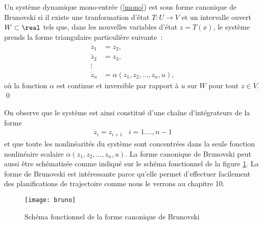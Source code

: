\begin{definition}{\blanc}

Un système dynamique mono-entrée (\ref{mono}) est sous forme canonique de Brunovski si il existe
 une tranformation d'état $ T : U \rightarrow V$ et un intervalle ouvert $W \subset \real$ 
  tels que, dans les nouvelles variables d'état $z=T(x)$, le système prends la forme triangulaire particulière suivante~:
 \begin{equation*} \begin{split}
 \dot z_1 &= z_2,\\
 \dot z_2 &= z_3,\\
 \vdots &\\
 \dot z_n &= \alpha (z_1, z_2, \ldots, z_n, u),
\end{split} \end{equation*}
où la fonction $\alpha$ est continue et inversible par rapport à $u$ sur $W$ pour tout $z \in V$.
\qed
\end{definition}

 On observe que le système est ainsi constitué d'une cha\^{i}ne d'intégrateurs
 de la forme
 \begin{equation*} \begin{split}
 \dot z_i = z_{i+1}\;\;\; i = 1. \ldots, n-1
 \end{split} \end{equation*}
 et que toute les nonlinéarités du système sont concentrées dans la seule
 fonction nonlinéaire scalaire $\alpha (z_1, z_2, \ldots, z_n, u)$.  La forme
 canonique de Brunovski peut aussi être schématisée comme indiqué sur le schéma fonctionnel de la
 figure \ref{Fig:bruno}. La forme de Brunovski est intéressante parce qu'elle permet d'effectuer facilement des planifications de trajectoire comme nous le verrons au chapitre 10.
  \begin{figure}[htbp] 
    \centering
    \texttt{[image: bruno]} 
    \caption{Schéma fonctionnel de la forme canonique de Brunovski}
    \label{Fig:bruno}
 \end{figure}
 
